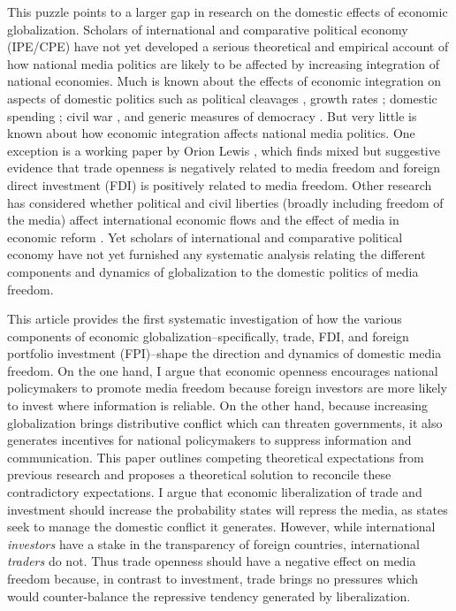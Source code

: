 \documentclass[12pt,a4paper]{article}\usepackage[]{graphicx}\usepackage[]{color}
\begin{document}
This puzzle points to a larger gap in research on the domestic effects of economic globalization. Scholars of international and comparative political economy (IPE/CPE) have not yet developed a serious theoretical and empirical account of how national media politics are likely to be affected by increasing integration of national economies. Much is known about the effects of economic integration on aspects of domestic politics such as political cleavages \parencites{Rogowski:1987ip}{Rogowski:1989wm}{Hiscox:2002us}{hiscox2002international}, growth rates \parencite{Rodriguez:2001uw}; domestic spending \parencites{Rodrik:1998te}{Burgoon:2001dp}; civil war \parencites{Barbieri:2005uk}{Bussmann:2007vx}, and generic measures of democracy \parencites{EICHENGREEN:2008gg}{Li:2003vj}. But very little is known about how economic integration affects national media politics. One exception is a working paper by Orion Lewis \parencite*{Lewis:qDvYbWlU}, which finds mixed but suggestive evidence that trade openness is negatively related to media freedom and foreign direct investment (FDI) is positively related to media freedom. Other research has considered whether political and civil liberties (broadly including freedom of the media) affect international economic flows \parencite{Adam:2007gn} and the effect of media in economic reform \parencites{Coyne:2004bq}{Islam:2002uc}. Yet scholars of international and comparative political economy have not yet furnished any systematic analysis relating the different components and dynamics of globalization to the domestic politics of media freedom.

This article provides the first systematic investigation of how the various components of economic globalization--specifically, trade, FDI, and foreign portfolio investment (FPI)--shape the direction and dynamics of domestic media freedom. On the one hand, I argue that economic openness encourages national policymakers to promote media freedom because foreign investors are more likely to invest where information is reliable. On the other hand, because increasing globalization brings distributive conflict which can threaten governments, it also generates incentives for national policymakers to suppress information and communication. This paper outlines competing theoretical expectations from previous research and proposes a theoretical solution to reconcile these contradictory expectations. I argue that economic liberalization of trade and investment should increase the probability states will repress the media, as states seek to manage the domestic conflict it generates. However, while international \emph{investors} have a stake in the transparency of foreign countries, international \emph{traders} do not. Thus trade openness should have a negative effect on media freedom because, in contrast to investment, trade brings no pressures which would counter-balance the repressive tendency generated by liberalization.
\end{document}
